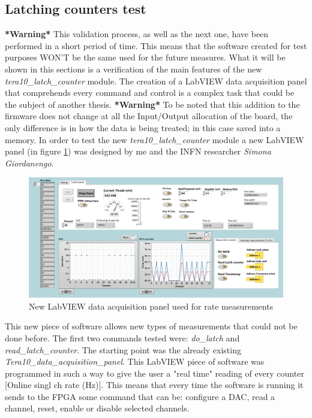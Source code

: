 \subsection{Latching counters test}
\textbf{*Warning*} This validation process, as well as the next one, have been performed in a short period of time. This means that the software created for test purposes WON'T be the same used for the future measures. What it will be shown in this sections is a verification of the main features of the new \textit{tera10\_latch\_counter} module. The creation of a LabVIEW data acquisition panel that comprehends every command and control is a complex task that could be the subject of another thesis. \textbf{*Warning*}
\newline
To be noted that this addition to the firmware does not change at all the Input/Output allocation of the board, the only difference is in how the data is being treated; in this case saved into a memory.
In order to test the new \textit{tera10\_latch\_counter} module a new LabVIEW panel (in figure \ref{fig:newlabviewpanel}) was designed by me and the INFN researcher \textit{Simona Giordanengo}.
\begin{figure}[H]
	\centering
	\includegraphics[width=0.99\linewidth]{IMG/ch5/latch_tests/fig1.PNG}
	\caption{New LabVIEW data acquisition panel used for rate measurements}
	\label{fig:newlabviewpanel}
\end{figure}
\noindent This new piece of software allows new types of measurements that could not be done before.
The first two commands tested were: \textit{do\_latch} and \textit{read\_latch\_counter}. The starting point was the already existing \textit{Tera10\_data\_acquisition\_panel}. This LabVIEW piece of software was programmed in such a way to give the user a "real time" reading of every counter [Online singl ch rate (Hz)].
This means that every time the software is running it sends to the FPGA some command that can be: configure a DAC, read a channel, reset, enable or disable selected channels.
